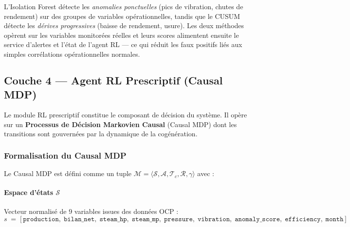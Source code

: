 L'Isolation Forest détecte les \emph{anomalies ponctuelles} (pics de vibration, chutes de rendement) sur des groupes de variables opérationnelles, tandis que le CUSUM détecte les \emph{dérives progressives} (baisse de rendement, usure). Les deux méthodes opèrent sur les variables monitorées réelles et leurs scores alimentent ensuite le service d'alertes et l'état de l'agent RL — ce qui réduit les faux positifs liés aux simples corrélations opérationnelles normales.

\subsection{Couche 4 — Agent RL Prescriptif (Causal MDP)}
\label{subsec:bf_rl_section}

Le module RL prescriptif constitue le composant de décision du système. Il opère sur un \textbf{Processus de Décision Markovien Causal} (Causal MDP) dont les transitions sont gouvernées par la dynamique de la cogénération.

\subsubsection{Formalisation du Causal MDP}

Le Causal MDP est défini comme un tuple $\mathcal{M} = \langle \mathcal{S}, \mathcal{A}, \mathcal{T}_c, \mathcal{R}, \gamma \rangle$ avec :

\paragraph{Espace d'états $\mathcal{S}$}
Vecteur normalisé de 9 variables issues des données OCP :
\begin{equation}
  s \;=\; \bigl[\,\texttt{production},\; \texttt{bilan\_net},\;
                  \texttt{steam\_hp},\; \texttt{steam\_mp},\;
                  \texttt{pressure},\; \texttt{vibration},\;
                  \texttt{anomaly\_score},\; \texttt{efficiency},\; \texttt{month}\,\bigr]
  \label{eq:state_space}
\end{equation}

